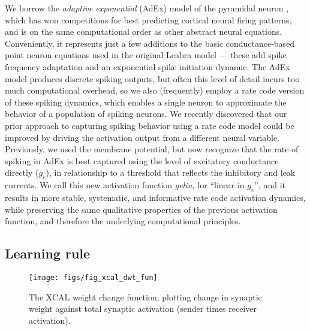\documentclass[11pt,twoside]{article}
\begin{document}
We borrow the {\em adaptive exponential} (AdEx) model of the pyramidal neuron
\cite{BretteGerstner05}, which has won competitions for best predicting
cortical neural firing patterns, and is on the same computational order as
other abstract neural equations.  Conveniently, it represents just a few
additions to the basic conductance-based point neuron equations used in the
original Leabra model --- these add spike frequency adaptation and an
exponential spike initiation dynamic.  The AdEx model produces discrete
spiking outputs, but often this level of detail incurs too much computational
overhead, so we also (frequently) employ a rate code version of these spiking
dynamics, which enables a single neuron to approximate the behavior of a
population of spiking neurons.  We recently discovered that our prior approach
to capturing spiking behavior using a rate code model could be improved by
driving the activation output from a different neural variable.  Previously, we
used the membrane potential, but now recognize that the rate of spiking in
AdEx is best captured using the level of excitatory conductance directly
($g_e$), in relationship to a threshold that reflects the inhibitory and leak
currents.  We call this new activation function {\em gelin}, for ``linear in
$g_e$'', and it results in more stable, systematic, and informative rate code
activation dynamics, while preserving the same qualitative properties of the
previous activation function, and therefore the underlying computational
principles.

\subsection{Learning rule}

\begin{figure}
  \centering\texttt{[image: figs/fig\_xcal\_dwt\_fun]}
  \caption{\small The XCAL weight change function, plotting change in
    synaptic weight against total synaptic activation (sender times receiver
    activation).}
  \label{fig.xcal_fun}
\end{figure}
\end{document}
